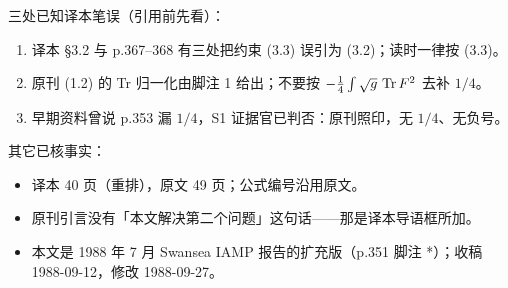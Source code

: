 三处已知译本笔误（引用前先看）：
\begin{enumerate}[leftmargin=2em]
\item 译本 §3.2 与 p.367--368 有三处把约束 (3.3) 误引为 (3.2)；读时一律按 (3.3)。
\item 原刊 (1.2) 的 Tr 归一化由脚注 1 给出；不要按 $-\frac14\int\sqrt g\,\operatorname{Tr} F^2$ 去补 $1/4$。
\item 早期资料曾说 p.353 漏 $1/4$，S1 证据官已判否：原刊照印，无 $1/4$、无负号。
\end{enumerate}

其它已核事实：
\begin{itemize}[leftmargin=1.6em]
\item 译本 40 页（重排），原文 49 页；公式编号沿用原文。
\item 原刊引言没有「本文解决第二个问题」这句话——那是译本导语框所加。
\item 本文是 1988 年 7 月 Swansea IAMP 报告的扩充版（p.351 脚注 *）；收稿 1988-09-12，修改 1988-09-27。
\end{itemize}
